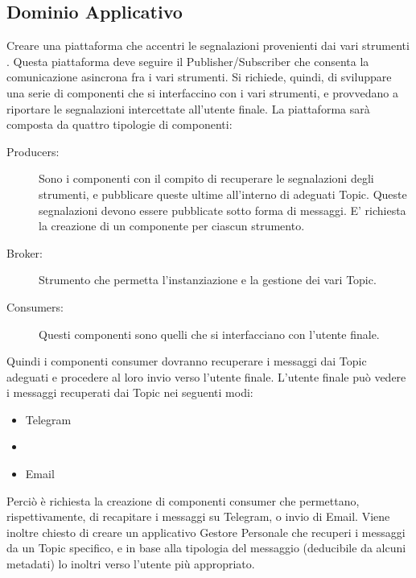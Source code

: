 	\subsection{Dominio Applicativo}
Creare una piattaforma  che accentri le segnalazioni provenienti dai vari strumenti .
Questa piattaforma  deve seguire il  Publisher/Subscriber che consenta la comunicazione asincrona fra i vari strumenti.
Si richiede, quindi, di sviluppare una serie di componenti che si interfaccino con i vari strumenti, e provvedano a riportare le segnalazioni intercettate all'utente finale.
La piattaforma sarà composta da quattro tipologie di componenti:
\begin{description}
 \item[Producers:] Sono i componenti con il compito di recuperare le segnalazioni degli strumenti, e pubblicare queste ultime all'interno di adeguati Topic. Queste segnalazioni devono essere pubblicate sotto forma di messaggi.
E' richiesta la creazione di un componente per ciascun strumento.
 \item[Broker:] Strumento che permetta l'instanziazione e la gestione dei vari Topic.
 \item[Consumers:] Questi componenti sono quelli che si interfacciano con l'utente finale. 
\end{description}
 
Quindi i componenti consumer dovranno recuperare i messaggi dai Topic adeguati e procedere al loro
   invio verso l'utente finale. 
   L'utente finale può vedere i messaggi recuperati dai Topic nei seguenti modi:
\begin{itemize}
    \item Telegram
    \item {}
    \item Email
\end{itemize}
   Perciò è richiesta la creazione di componenti consumer che permettano, rispettivamente, di recapitare i messaggi su Telegram,  o invio di Email.
Viene inoltre chiesto di creare un applicativo Gestore Personale che recuperi i messaggi da un Topic specifico, e in base alla tipologia del messaggio (deducibile da alcuni metadati) lo inoltri verso l'utente più appropriato.

